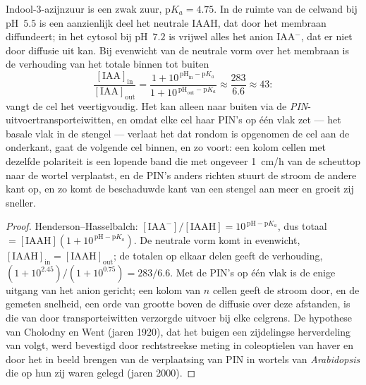 \begin{theorem}\label{thm:b3:plant-molecular-physiology:auxin}
Indool-3-azijnzuur is een zwak zuur, $\mathrm{p}K_{a} = 4.75$. In de
ruimte van de celwand bij pH~$5.5$ is een aanzienlijk deel het neutrale
IAAH, dat door het membraan diffundeert; in het cytosol bij pH~$7.2$ is
vrijwel alles het anion IAA$^{-}$, dat er niet door diffusie uit kan.
Bij evenwicht van de neutrale vorm over het membraan is de verhouding
van het totale  binnen tot buiten
\[
\frac{[\text{IAA}]_{\text{in}}}{[\text{IAA}]_{\text{out}}}
= \frac{1 + 10^{\,\mathrm{pH}_{\text{in}} - \mathrm{p}K_{a}}}{1 + 10^{\,\mathrm{pH}_{\text{out}} - \mathrm{p}K_{a}}}
\approx \frac{283}{6.6} \approx 43 :
\]
vangt de cel het  veertigvoudig. Het kan alleen naar buiten via
de \emph{PIN}-uitvoertransporteiwitten, en omdat elke cel haar PIN's op
één vlak zet --- het basale vlak in de stengel --- verlaat het 
dat rondom is opgenomen de cel aan de onderkant, gaat de volgende cel
binnen, en zo voort: een kolom cellen met dezelfde polariteit is een
lopende band die  met ongeveer \qty{1}{cm/h} van de scheuttop
naar de wortel verplaatst, en de PIN's anders richten stuurt de stroom
de andere kant op, en zo komt de beschaduwde kant van een stengel aan
meer  en groeit zij sneller.
\end{theorem}
\begin{proof}
Henderson--Hasselbalch: $[\text{IAA}^{-}]/[\text{IAAH}] = 10^{\,\mathrm{pH}
- \mathrm{p}K_{a}}$, dus totaal $= [\text{IAAH}](1 + 10^{\,\mathrm{pH} -
\mathrm{p}K_{a}})$. De neutrale vorm komt in evenwicht, $[\text{IAAH}]_{\text{in}}
= [\text{IAAH}]_{\text{out}}$; de totalen op elkaar delen geeft de
verhouding, $(1 + 10^{2.45})/(1 + 10^{0.75}) = 283/6.6$. Met de PIN's
op één vlak is de enige uitgang van het anion gericht; een kolom van
$n$ cellen geeft de stroom door, en de gemeten snelheid, een orde van
grootte boven de diffusie over deze afstanden, is die van door
transporteiwitten verzorgde uitvoer bij elke celgrens. De hypothese van
Cholodny en Went (jaren 1920), dat het buigen een zijdelingse
herverdeling van  volgt, werd bevestigd door rechtstreekse meting
in coleoptielen van haver en door het in beeld brengen van de
verplaatsing van PIN in wortels van \emph{Arabidopsis} die op hun zij
waren gelegd (jaren 2000).
\end{proof}

